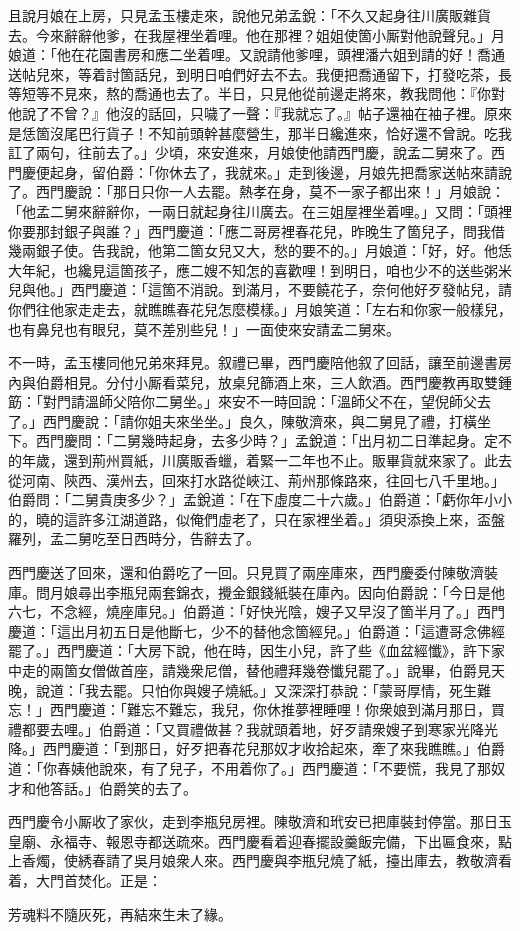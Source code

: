 且說月娘在上房，只見孟玉樓走來，說他兄弟孟銳：「不久又起身往川廣販雜貨去。今來辭辭他爹，在我屋裡坐着哩。他在那裡？姐姐使箇小厮對他說聲兒。」月娘道：「他在花園書房和應二坐着哩。又說請他爹哩，頭裡潘六姐到請的好！喬通送帖兒來，等着討箇話兒，到明日咱們好去不去。我便把喬通留下，打發吃茶，長等短等不見來，熬的喬通也去了。半日，只見他從前邊走將來，教我問他：『你對他說了不曾？』他沒的話回，只噦了一聲：『我就忘了。』{}帖子還袖在袖子裡。原來是恁箇沒尾巴行貨子！不知前頭幹甚麼營生，那半日纔進來，恰好還不曾說。吃我訌了兩句，往前去了。」少頃，來安進來，月娘使他請西門慶，說孟二舅來了。西門慶便起身，留伯爵：「你休去了，我就來。」走到後邊，月娘先把喬家送帖來請說了。西門慶說：「那日只你一人去罷。熱孝在身，莫不一家子都出來！」{}月娘說：「他孟二舅來辭辭你，一兩日就起身往川廣去。在三姐屋裡坐着哩。」又問：「頭裡你要那封銀子與誰？」西門慶道：「應二哥房裡春花兒，昨晚生了箇兒子，問我借幾兩銀子使。告我說，他第二箇女兒又大，愁的要不的。」月娘道：「好，好。他恁大年紀，也纔見這箇孩子，應二嫂不知怎的喜歡哩！{}到明日，咱也少不的送些粥米兒與他。」西門慶道：「這箇不消說。到滿月，不要饒花子，奈何他好歹發帖兒，請你們往他家走走去，就瞧瞧春花兒怎麼模樣。」{}月娘笑道：「左右和你家一般樣兒，也有鼻兒也有眼兒，莫不差別些兒！」一面使來安請孟二舅來。

不一時，孟玉樓同他兄弟來拜見。叙禮已畢，西門慶陪他叙了回話，讓至前邊書房內與伯爵相見。分付小厮看菜兒，放桌兒篩酒上來，三人飲酒。西門慶教再取雙鍾筯：「對門請溫師父陪你二舅坐。」來安不一時回說：「溫師父不在，望倪師父去了。」{}西門慶說：「請你姐夫來坐坐。」良久，陳敬濟來，與二舅見了禮，{}打橫坐下。西門慶問：「二舅幾時起身，去多少時？」孟銳道：「出月初二日準起身。定不的年歲，還到荊州買紙，川廣販香蠟，着緊一二年也不止。販畢貨就來家了。此去從河南、陝西、漢州去，回來打水路從峽江、荊州那條路來，往回七八千里地。」伯爵問：「二舅貴庚多少？」孟銳道：「在下虛度二十六歲。」伯爵道：「虧你年小小的，曉的這許多江湖道路，似俺們虛老了，只在家裡坐着。」{}須臾添換上來，盃盤羅列，孟二舅吃至日西時分，告辭去了。

西門慶送了回來，還和伯爵吃了一回。只見買了兩座庫來，西門慶委付陳敬濟裝庫。問月娘尋出李瓶兒兩套錦衣，攪金銀錢紙裝在庫內。因向伯爵說：「今日是他六七，不念經，燒座庫兒。」伯爵道：「好快光陰，嫂子又早沒了箇半月了。」西門慶道：「這出月初五日是他斷七，少不的替他念箇經兒。」伯爵道：「這遭哥念佛經罷了。」{}西門慶道：「大房下說，他在時，因生小兒，許了些《血盆經懺》，許下家中走的兩箇女僧做首座，請幾衆尼僧，替他禮拜幾卷懺兒罷了。」說畢，伯爵見天晚，說道：「我去罷。只怕你與嫂子燒紙。」又深深打恭說：「蒙哥厚情，死生難忘！」西門慶道：「難忘不難忘，我兒，你休推夢裡睡哩！你衆娘到滿月那日，買禮都要去哩。」伯爵道：「又買禮做甚？我就頭着地，好歹請衆嫂子到寒家光降光降。」西門慶道：「到那日，好歹把春花兒那奴才收拾起來，牽了來我瞧瞧。」{}伯爵道：「你春姨他說來，有了兒子，不用着你了。」西門慶道：「不要慌，我見了那奴才和他答話。」伯爵笑的去了。

西門慶令小厮收了家伙，走到李瓶兒房裡。陳敬濟和玳安已把庫裝封停當。那日玉皇廟、永福寺、報恩寺都送疏來。西門慶看着迎春擺設羹飯完備，下出匾食來，點上香燭，使綉春請了吳月娘衆人來。西門慶與李瓶兒燒了紙，擡出庫去，教敬濟看着，大門首焚化。正是：

\begin{myquote} 
芳魂料不隨灰死，再結來生未了緣。
\end{myquote} 

